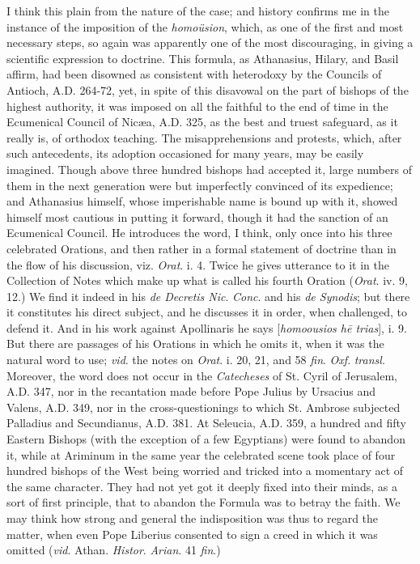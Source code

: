 I think this plain from the nature of the
case; and history confirms me in the instance of the
imposition of the \emph{homoüsion}, which, as one of the
first and most necessary steps, so again was apparently
one of the most discouraging, in giving a scientific
expression to doctrine. This formula, as Athanasius, Hilary,
and Basil affirm, had been disowned as consistent with heterodoxy
by the Councils of Antioch, A.D.
264-72, yet, in spite of this disavowal on the part of bishops
of the highest authority, it was imposed on all the faithful
to the end of time in the Ecumenical Council of Nicæa, A.D. 325, as the best and
truest safeguard, as it really is, of orthodox teaching. The
misapprehensions and protests, which, after such antecedents,
its adoption occasioned for many years, may be easily
imagined. Though above three hundred bishops had accepted it,
large numbers of them in the next
generation were but imperfectly convinced of its expedience; and Athanasius himself,
whose imperishable name is bound up with it, showed himself
most cautious in putting it forward, though it had the
sanction of an Ecumenical Council. He introduces the word, I
think, only once into his three celebrated Orations, and then
rather in a formal statement of doctrine than in the flow of
his discussion, viz. \emph{Orat}. i. 4. Twice he gives
utterance to it in the Collection of Notes which make up what
is called his fourth Oration (\emph{Orat}. iv. 9, 12.) We find
it indeed in his \emph{de Decretis Nic}. \emph{Conc}. and his \emph{de
Synodis}; but there it constitutes his direct subject, and
he discusses it in order, when challenged, to defend it. And
in his work against Apollinaris he says [\emph{homoousios h\={e}
trias}], i. 9. But there are passages of his Orations in
which he omits it, when it was the natural word to use; \emph{vid}.
the notes on \emph{Orat}. i. 20, 21, and 58 \emph{fin}. \emph{Oxf}.
\emph{transl}. Moreover, the word does not occur in the \emph{Catecheses}
of St. Cyril of Jerusalem, A.D.
347, nor in the recantation made before Pope Julius by
Ursacius and Valens, A.D. 349, nor in the cross-questionings to
which St. Ambrose subjected Palladius and Secundianus, A.D.
381. At Seleucia, A.D. 359, a hundred and fifty Eastern Bishops
(with the exception of a few Egyptians) were found to abandon
it, while at Ariminum in the same year the celebrated scene
took place of four hundred bishops of the West being worried
and tricked into a momentary act of the same character. They
had not yet got it deeply fixed into their minds, as a sort of
first principle, that to abandon the Formula was to betray the
faith. We may think how strong and general the indisposition
was thus to regard the matter, when even Pope Liberius
consented to sign a creed in which it was omitted (\emph{vid}.
Athan. \emph{Histor}. \emph{Arian}. 41 \emph{fin}.)

